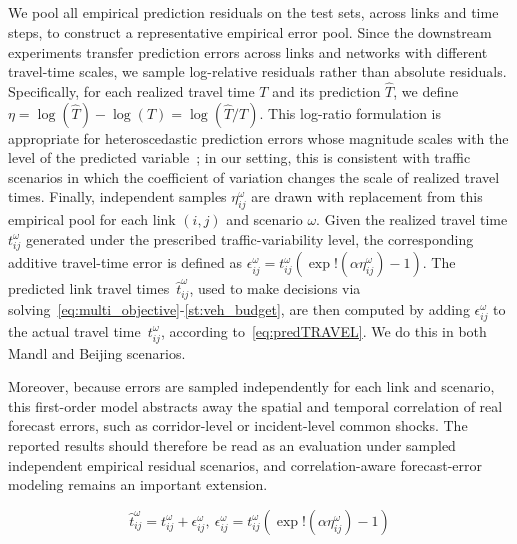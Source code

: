 \subsection{}\label{A3}

We pool all empirical prediction residuals on the test sets, across links and time steps, to construct a representative empirical error pool. Since the downstream experiments transfer prediction errors across links and networks with different travel-time scales, we sample log-relative residuals rather than absolute residuals. Specifically, for each realized travel time $T$ and its prediction $\hat T$, we define $\eta=\log(\hat T)-\log(T)=\log\left(\hat T/T\right)$.
%
This log-ratio formulation is appropriate for heteroscedastic prediction errors whose magnitude scales with the level of the predicted variable~\citep{Tofallis2015}; in our setting, this is consistent with traffic scenarios in which the coefficient of variation changes the scale of realized travel times. 
%
Finally, independent samples $\eta_{ij}^{\omega}$ are drawn with replacement from this empirical pool for each link $(i,j)$ and scenario $\omega$. Given the realized travel time $t_{ij}^{\omega}$ generated under the prescribed traffic-variability level, the corresponding additive travel-time error is defined as $\epsilon_{ij}^{\omega}=t_{ij}^{\omega}\left(\exp!\left(\alpha\eta_{ij}^{\omega}\right)-1\right)$. The predicted link travel times~$\hat t_{ij}^{\omega}$, used to make decisions via solving~\eqref{eq:multi_objective}-\eqref{st:veh_budget}, are then computed by adding $\epsilon_{ij}^{\omega}$ to the actual travel time~$t_{ij}^{\omega}$, according to~\eqref{eq:predTRAVEL}. We do this in both Mandl and Beijing scenarios.

Moreover, because errors are sampled independently for each link and scenario, this first-order model abstracts away the spatial and temporal correlation of real forecast errors, such as corridor-level or incident-level common shocks. The reported results should therefore be read as an evaluation under sampled independent empirical residual scenarios, and correlation-aware forecast-error modeling remains an important extension.

\begin{equation}
\hat t_{ij}^{\omega} = t_{ij}^{\omega}
+
\epsilon_{ij}^{\omega}, \
%
\epsilon_{ij}^{\omega} =
t_{ij}^{\omega}
\left(
\exp!\left(\alpha\eta_{ij}^{\omega}\right)-1
\right)
\label{eq:predTRAVEL}
\end{equation}


